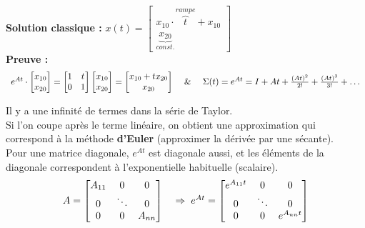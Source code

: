 \documentclass[document.tex]{subfiles}
\begin{document}
\textbf{Solution classique : } $x(t) = \begin{bmatrix} x_{10} \cdot \overbrace{t}^{rampe} + x_{10} \\ \underbrace{x_{20}}_{const.} \end{bmatrix} $ \\
\textbf{Preuve : }
$$
\begin{array}{l c l}
	e^{At} \cdot \begin{bmatrix} x_{10} \\ x_{20} \end{bmatrix} = \begin{bmatrix} 1 & t \\ 0 & 1 \end{bmatrix} \begin{bmatrix} x_{10} \\ x_{20} \end{bmatrix} = \begin{bmatrix} x_{10} + t x_{20} \\ x_{20} \end{bmatrix} &\text{ \& }& \Sigma(t) = e^{At}=I+At+\frac{(At)^2}{2!}+\frac{(At)^3}{3!}+\ldots
\end{array}
$$

Il y a une infinité de termes dans la série de Taylor.\\
Si l'on coupe après le terme linéaire, on obtient une approximation qui correspond à la méthode \textbf{d’Euler} (approximer la dérivée par une sécante).\\

Pour une matrice diagonale, $\boxed{e^{At}}$ est diagonale aussi, et les éléments de la  diagonale correspondent à l'exponentielle habituelle (scalaire). \\ 

\begin{equation}
\begin{array}{l l}
A=\begin{bmatrix} A_{11} & 0 & 0 \\ 0 & \ddots & 0 \\ 0 & 0 & A_{nn} \end{bmatrix} & \; \Rightarrow \; e^{At}=\begin{bmatrix} e^{A_{11}t} & 0 & 0 \\ 0 & \ddots & 0 \\ 0 & 0 & e^{A_{nn}t} \end{bmatrix}
\end{array}
\end{equation}
\end{document}
